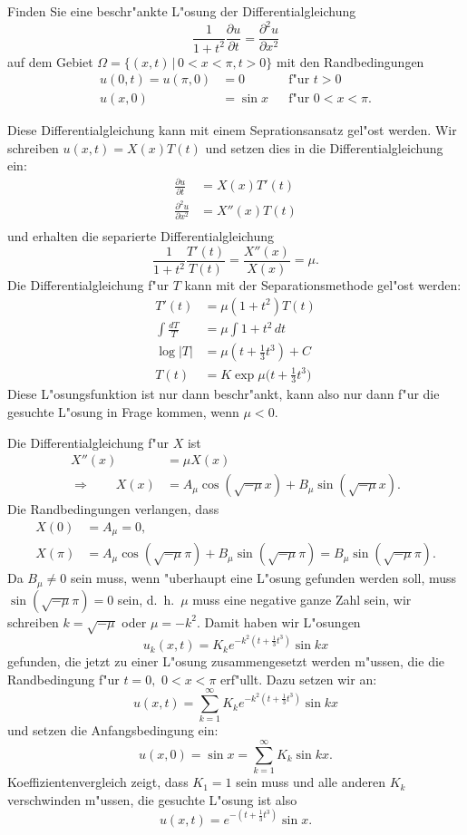 Finden Sie eine beschr"ankte L"osung der Differentialgleichung
\begin{equation}
\frac1{1+t^2}\frac{\partial u}{\partial t}=\frac{\partial^2 u}{\partial x^2}
\label{40000010:dgl}
\end{equation}
auf dem Gebiet $\Omega=\{(x,t)\,|\, 0<x<\pi,t>0\}$ 
mit den Randbedingungen
\begin{align*}
u(0,t)=u(\pi,0)&=0&&\text{f"ur $t > 0$}\\
u(x,0)&=\sin x&&\text{f"ur $0<x<\pi$}.
\end{align*}

\begin{loesung}
Diese Differentialgleichung kann mit einem Seprationsansatz gel"ost werden.
Wir schreiben $u(x,t)=X(x)T(t)$ und setzen dies in die Differentialgleichung
ein:
\begin{align*}
\frac{\partial u}{\partial t}&=X(x)T'(t)\\
\frac{\partial^2 u}{\partial x^2}&=X''(x)T(t)\\
\end{align*}
und erhalten die separierte Differentialgleichung
\[
\frac1{1+t^2}\frac{T'(t)}{T(t)}=\frac{X''(x)}{X(x)}=\mu.
\]
Die Differentialgleichung f"ur $T$ kann mit der Separationsmethode
gel"ost werden:
\begin{align*}
T'(t)&=\mu (1+t^2)T(t)\\
\int\frac{dT}{T}&=\mu\int 1+t^2\,dt\\
\log|T|&=\mu(t+\frac13t^3) +C\\
T(t)&=K\exp\mu\biggl(t+\frac13t^3\biggr)
\end{align*}
Diese L"osungsfunktion ist nur dann beschr"ankt, kann also nur dann
f"ur die gesuchte L"osung in Frage kommen, wenn $\mu <0$.

Die Differentialgleichung f"ur $X$ ist
\begin{align*}
X''(x)&=\mu X(x)\\
\Rightarrow\qquad
X(x)&=A_\mu \cos(\sqrt{-\mu}x) + B_\mu\sin(\sqrt{-\mu}x).
\end{align*}
Die Randbedingungen verlangen, dass
\begin{align*}
X(0)&=A_\mu=0,\\
X(\pi)&=A_\mu\cos(\sqrt{-\mu}\pi)+B_\mu\sin(\sqrt{-\mu}\pi)=B_\mu\sin(\sqrt{-\mu}\pi).
\end{align*}
Da $B_\mu\ne 0$ sein muss, wenn "uberhaupt eine L"osung gefunden werden
soll, muss $\sin(\sqrt{-\mu}\pi)=0$ sein, d.~h.~$\mu$ muss eine negative ganze
Zahl sein, wir schreiben $k=\sqrt{-\mu}$ oder $\mu=-k^2$.
Damit haben wir L"osungen
\[
u_k(x,t)=K_k e^{-k^2(t+\frac13t^3)}\sin kx
\]
gefunden, die jetzt zu einer L"osung zusammengesetzt werden m"ussen, die
die Randbedingung f"ur $t=0,$ $0<x<\pi$ erf"ullt. Dazu setzen wir an:
\[
u(x,t)=\sum_{k=1}^\infty K_k e^{-k^2(t+\frac13t^3)}\sin kx
\]
und setzen die Anfangsbedingung ein:
\[
u(x,0)=\sin x=\sum_{k=1}^\infty K_k \sin kx.
\]
Koeffizientenvergleich zeigt, dass $K_1=1$ sein muss und alle anderen $K_k$
verschwinden m"ussen, die gesuchte L"osung ist also
\[
u(x,t)=e^{-(t+\frac13t^3)}\sin x.
\]
\end{loesung}

